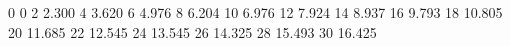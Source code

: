 0 0
2  2.300
4  3.620
6  4.976
8  6.204
10 6.976
12 7.924
14 8.937
16 9.793
18 10.805
20 11.685
22 12.545
24 13.545
26 14.325
28 15.493
30 16.425
